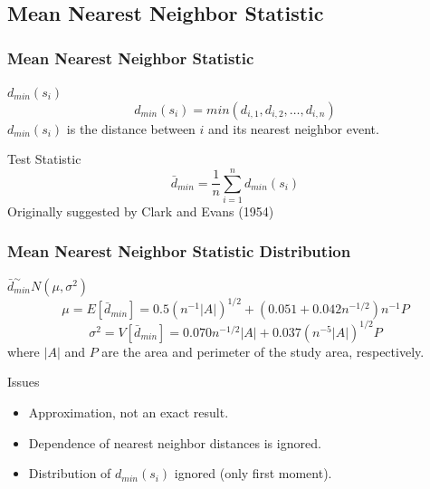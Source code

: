 \documentclass[nototal,handout]{beamer}
\begin{document}
\subsection{Mean Nearest Neighbor Statistic}
\begin{frame}[<+->]
  \frametitle{Mean Nearest Neighbor Statistic}
  \begin{block}{$d_{min}(s_i)$}
    \begin{equation}
      d_{min}(s_i) = min(d_{i,1},d_{i,2},\ldots,d_{i,n})
    \end{equation}
   $d_{min}(s_i)$ is the distance between $i$ and its nearest neighbor event.
   \end{block}
  \begin{block}{Test Statistic}
    \begin{equation}
	\bar{d}_{min}= \frac{1}{n} \sum_{i=1}^n d_{min}(s_i)
    \end{equation}
    Originally suggested by Clark and Evans (1954)
   \end{block}
 \end{frame}
\begin{frame}[<+->]
  \frametitle{Mean Nearest Neighbor Statistic Distribution}
  \begin{block}{$\bar{d}_{min}^{\sim}N(\mu,\sigma^2)$}
    \begin{equation}
      \mu=E[\bar{d}_{min}] = 0.5(n^{-1} |A|)^{1/2} + (0.051 + 0.042n^{-1/2})n^{-1}
      P
    \end{equation}
    \begin{equation}
      \sigma^2 = V[\bar{d}_{min}] =0.070n^{-1/2} |A| + 0.037(n^{-5}|A|)^{1/2}P
    \end{equation}
    where $|A|$ and $P$ are the area and perimeter of the study area,
    respectively.
   \end{block}
   \begin{block}{Issues}
     \begin{itemize}
       \item Approximation, not an exact result.
       \item Dependence of nearest neighbor distances is ignored.
       \item Distribution of $d_{min}(s_i)$ ignored (only first moment).
     \end{itemize}
   \end{block}
 \end{frame}
\end{document}
